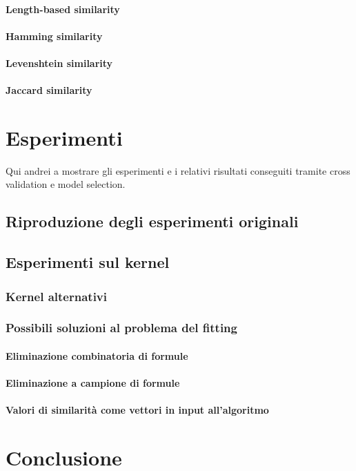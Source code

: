 \documentclass[12pt,a4paper]{report}
\begin{document}
\subsubsection{Length-based similarity}
\subsubsection{Hamming similarity}
\subsubsection{Levenshtein similarity}
\subsubsection{Jaccard similarity}

\chapter{Esperimenti}
Qui andrei a mostrare gli esperimenti e i relativi risultati conseguiti tramite cross validation e model selection.
\section{Riproduzione degli esperimenti originali}
\section{Esperimenti sul kernel}
\subsection{Kernel alternativi}
\subsection{Possibili soluzioni al problema del fitting}
\subsubsection{Eliminazione combinatoria di formule}
\subsubsection{Eliminazione a campione di formule}
\subsubsection{Valori di similarità come vettori in input all'algoritmo}

\chapter*{Conclusione}



\end{document}
